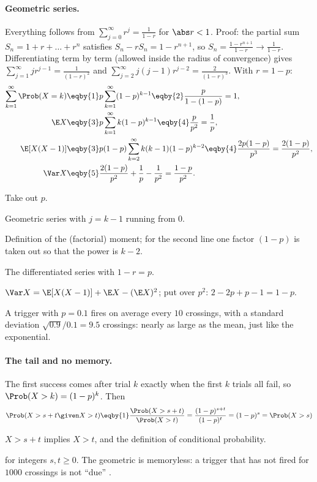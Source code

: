 \paragraph{Geometric series.} Everything follows from $\sum_{j=0}^\infty r^j=\frac1{1-r}$ for $\abs r<1$. Proof: the partial sum $S_n=1+r+\dots+r^n$ satisfies $S_n-rS_n=1-r^{n+1}$, so $S_n=\frac{1-r^{n+1}}{1-r}\to\frac1{1-r}$. Differentiating term by term (allowed inside the radius of convergence) gives $\sum_{j=1}^\infty jr^{j-1}=\frac1{(1-r)^2}$ and $\sum_{j=2}^\infty j(j-1)r^{j-2}=\frac2{(1-r)^3}$. With $r=1-p$:
\begin{align*}
  \sum_{k=1}^\infty\Prob(X=k) &\eqby{1} p\sum_{k=1}^\infty(1-p)^{k-1} \eqby{2} \frac{p}{1-(1-p)}=1,\\
  \E X &\eqby{3} p\sum_{k=1}^\infty k(1-p)^{k-1} \eqby{4} \frac{p}{p^2}=\frac1p,\\
  \E[X(X-1)] &\eqby{3} p(1-p)\sum_{k=2}^\infty k(k-1)(1-p)^{k-2} \eqby{4} \frac{2p(1-p)}{p^3}=\frac{2(1-p)}{p^2},\\
  \Var X &\eqby{5} \frac{2(1-p)}{p^2}+\frac1p-\frac1{p^2}=\frac{1-p}{p^2}.
\end{align*}
\begin{explain}
  \item Take out $p$.
  \item Geometric series with $j=k-1$ running from $0$.
  \item Definition of the (factorial) moment; for the second line one factor $(1-p)$ is taken out so that the power is $k-2$.
  \item The differentiated series with $1-r=p$.
  \item $\Var X=\E[X(X-1)]+\E X-(\E X)^2$; put over $p^2$: $2-2p+p-1=1-p$.
\end{explain}
A trigger with $p=0.1$ fires on average every $10$ crossings, with a standard deviation $\sqrt{0.9}/0.1=9.5$ crossings: nearly as large as the mean, just like the exponential.

\paragraph{The tail and no memory.} The first success comes after trial $k$ exactly when the first $k$ trials all fail, so $\Prob(X>k)=(1-p)^k$. Then
\begin{align*}
  \Prob(X>s+t\given X>t) \eqby{1} \frac{\Prob(X>s+t)}{\Prob(X>t)} = \frac{(1-p)^{s+t}}{(1-p)^t} = (1-p)^s = \Prob(X>s)
\end{align*}
\begin{explain}
  \item $X>s+t$ implies $X>t$, and the definition of conditional probability.
\end{explain}
for integers $s,t\ge0$. The geometric is memoryless: a trigger that has not fired for $1000$ crossings is not ``due'' .


